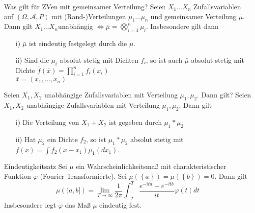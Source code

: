 \documentclass[avery5371,grid,frame]{flashcards} %
\newcommand{\1}{ \mathbb{1} } %
\begin{document}
\begin{flashcard}[Satz]{Was gilt für ZVen mit gemeinsamer Verteilung?}
  Seien $X_{1}\ldots X_{n}$ Zufallsvariablen auf $\left(\Omega,\mathcal{A},P\right)$
  mit (Rand-)Verteilungen $\mu_{1}\ldots\mu_{n}$ und gemeinsamer Verteilung
  $\bar{\mu}$. Dann gilt $X_{1}\ldots X_{n}$unabhängig $\Leftrightarrow\bar{\mu}=\bigotimes_{i=1}^{n}\mu_{i}$.
  Insbesondere gilt dann
  \begin{itemize}
  \item [{i)}] $\bar{\mu}$ ist eindeutig festgelegt durch die $\mu$. 
  \item [{ii)}] Sind die $\mu_{i}$ absolut-stetig mit Dichten $f_{i}$,
    so ist auch $\bar{\mu}$ absolut-stetig mit Dichte
$
      \bar{f}\left(\bar{x}\right)  =
      \prod_{i=1}^{n}f_{i}\left(x_{i}\right)
$ \\
$
      \bar{x} = \left(x_{1},\ldots,x_{n}\right)
$
  \end{itemize}
\end{flashcard}

\begin{flashcard}[Satz]{  Seien $X_{1},X_{2}$ unabhängige
    Zufallsvariablen mit Verteilung $\mu_{1},\mu_{2}$. Dann gilt?}
  Seien $X_{1},X_{2}$ unabhängige Zufallsvariablen mit Verteilung $\mu_{1},\mu_{2}$.
  Dann gilt
  \begin{itemize}
  \item [{i)}] Die Verteilung von $X_{1}+X_{2}$ ist gegeben durch $\mu_{1}*\mu_{2}$
  \item [{ii)}] Hat $\mu_{2}$ ein Dichte $f_{2}$, so ist $\mu_{1}*\mu_{2}$
    absolut stetig mit $f\left(x\right)=\int f_{2}\left(x-x_{1}\right)\mu_{1}\left(dx_{1}\right)$. 
  \end{itemize}
\end{flashcard}

\begin{flashcard}[Satz]{Eindeutigkeitsatz}
  Sei $\mu$ ein Wahrscheinlichkeitsmaß mit charakteristischer Funktion
  $\varphi$ (Fourier-Transformierte). Sei $\mu\left(\left\{ a\right\} \right)=\mu\left(\left\{ b\right\} \right)=0$.
  Dann gilt
  \[
  \mu\left((a,b]\right)=\lim_{T\to\infty}\frac{1}{2\pi}\int_{-T}^{T}\frac{e^{-ita}-e^{-itb}}{it}\varphi\left(t\right)dt
  \]
  Insbesondere legt $\varphi$ das Maß $\mu$ eindeutig fest. 
\end{flashcard}
\end{document}
